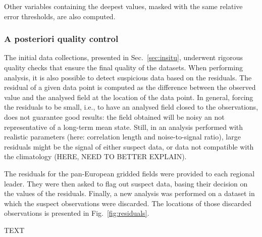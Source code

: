 \documentclass[essd, manuscript]{copernicus}
\begin{document}
Other variables containing the deepest values, masked with the same relative error thresholds, are also computed. 



\subsubsection{A posteriori quality control}

The initial data collections, presented in Sec.~\ref{sec:insitu}, underwent rigorous quality checks that ensure the final quality of the datasets. When performing analysis, it is also possible to detect suspicious data based on the residuals. The residual of a given data point is computed as the difference between the observed value and the analysed field at the location of the data point. In general, forcing the residuals to be small, i.e., to have an analysed field closed to the observations, does not guarantee good results: the field obtained will be noisy an not representative of a long-term mean state. Still, in an analysis performed with realistic parameters (here: correlation length and noise-to-signal ratio), large residuals might be the signal of either suspect data, or data not compatible with the climatology (HERE, NEED TO BETTER EXPLAIN).

The residuals for the pan-European gridded fields were provided to each regional leader. They were then asked to flag out suspect data, basing their decision on the values of the residuals. Finally, a new analysis was performed on a dataset in which the suspect observations were discarded. The locations of those discarded observations is presented in Fig.~\ref{fig:residuals}. 



\conclusions  %
TEXT

\end{document}
